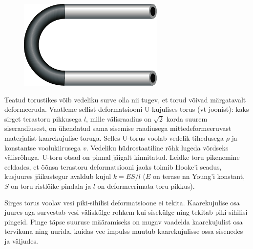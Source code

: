 
\begin{figure}
	\begin{center}
		\vspace{-15pt}
		\includegraphics[width=\linewidth]{2009-lahg-06-yl}
	\end{center}
\end{figure}
Teatud torustikes võib vedeliku surve olla nii tugev, et torud võivad märgatavalt deformeeruda. Vaatleme sellist deformatsiooni U-kujulises torus (vt joonist): kaks sirget terastoru pikkusega $l$, mille välisraadius on $\sqrt 2$ korda suurem siseraadiusest, on ühendatud sama sisemise raadiusega mittedeformeeruvast materjalist kaarekujulise toruga. Selles U-torus voolab vedelik tihedusega $\rho$ ja konstantse voolukiirusega $v$. Vedeliku hüdrostaatiline rõhk lugeda võrdseks välisrõhuga. U-toru otsad on pinnal jäigalt kinnitatud. Leidke toru pikenemine eeldades, et õõnsa terastoru deformatsiooni jaoks toimib Hooke’i seadus, kusjuures jäikustegur avaldub kujul $k = ES/l$ ($E$ on terase nn Young’i konstant, $S$ on toru ristlõike pindala ja $l$ on deformeerimata toru pikkus).

\hint
Sirges torus voolav vesi piki-sihilisi deformatsioone ei tekita. Kaarekujulise osa juures aga survestab vesi väliskülge rohkem kui sisekülge ning tekitab piki-sihilisi pingeid. Pinge täpse suuruse määramiseks on mugav vaadelda kaarekujulist osa tervikuna ning uurida, kuidas vee impulss muutub kaarekujulisse ossa sisenedes ja väljudes.

